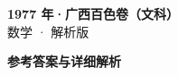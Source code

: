 \documentclass[zihao=-4, a4paper]{ctexart}
\begin{document}
\begin{center}
  {\Large\bfseries 1977 年·广西百色卷（文科）}\\[4pt]
  {\large 数学 · 解析版}
\end{center}
\medskip
{}

\clearpage
{}
\begin{center}{\Large\bfseries 参考答案与详细解析}\end{center}
\medskip

\end{document}
